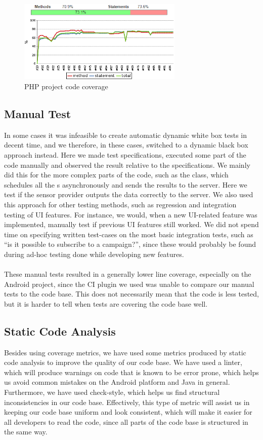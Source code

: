 \begin{figure}[!htbp]
    \centering
    \includegraphics[width=0.7\textwidth]{graphic/quality_assurance/jenkins_php_code_coverage}
    \caption{PHP project code coverage}
    \label{fig:php_project_code_coverage}
\end{figure}
\FloatBarrier

\subsection{Manual Test}
In some cases it was infeasible to create automatic dynamic white box tests in decent time, and we therefore, in these cases, switched to a dynamic black box approach instead. Here we made test specifications, executed some part of the code manually and observed the result relative to the specifications. We mainly did this for the more complex parts of the code, such as the  class, which schedules all the s asynchronously and sends the results to the server. Here we test if the sensor provider outputs the data correctly to the server. We also used this approach for other testing methods, such as regression and integration testing of UI features. For instance, we would, when a new UI-related feature was implemented, manually test if previous UI features still worked. We did not spend time on specifying written test-cases on the most basic integration tests, such as ``is it possible to subscribe to a campaign?'', since these would probably be found during ad-hoc testing done while developing new features.
\\\\
These manual tests resulted in a generally lower line coverage, especially on the Android project, since the CI plugin we used was unable to compare our manual tests to the code base. This does not necessarily mean that the code is less tested, but it is harder to tell when tests are covering the code base well. 

\subsection{Static Code Analysis}
Besides using coverage metrics, we have used some metrics produced by static code analysis to improve the quality of our code base. We have used a linter, which will produce warnings on code that is known to be error prone, which helps us avoid common mistakes on the Android platform and Java in general. Furthermore, we have used check-style, which helps us find structural inconsistencies in our code base. Effectively, this type of metric will assist us in keeping our code base uniform and look consistent, which will make it easier for all developers to read the code, since all parts of the code base is structured in the same way.

